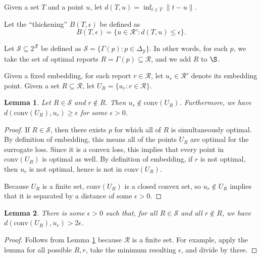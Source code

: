 \documentclass{article}
\newcommand{\Comments}{1}
\newcommand{\mynote}[2]{\ifnum\Comments=1\textcolor{#1}{#2}\fi}
\newcommand{\bo}[1]{\mynote{blue}{[Bo: #1]}}
\newcommand{\R}{\mathcal{R}}
\newcommand{\Y}{\mathcal{Y}}
\newcommand{\conv}{\mathrm{conv}}
\newtheorem{lemma}{Lemma}
\begin{document}
Given a set $T$ and a point $u$, let $d(T,u) = \inf_{t \in T} \|t-u\|$.

Let the ``thickening'' $B(T,\epsilon)$ be defined as
  \[ B(T,\epsilon) = \{u \in \R' : d(T,u) \leq \epsilon \} . \]

Let $\mathcal{S} \subseteq 2^{\R}$ be defined as $\mathcal{S} = \{\Gamma(p) : p \in \Delta_{\Y}\}$.
In other words, for each $p$, we take the set of optimal reports $R = \Gamma(p) \subseteq \R$, and we add $R$ to $\S$.

Given a fixed embedding, for each report $r \in \R$, let $u_r \in \R'$ denote its embedding point.
Given a set $R \subseteq \R$, let $U_R = \{u_r : r \in \R\}$.

\begin{lemma} \label{lemma:conv-R-no-contain}
  Let $R \in \mathcal{S}$ and $r \not\in R$.
  Then $u_r \not\in \conv(U_R)$.
  Furthermore, we have $d(\conv(U_R), u_r) \geq \epsilon$ for some $\epsilon > 0$.
\end{lemma}
\begin{proof}
  If $R \in \mathcal{S}$, then there exists $p$ for which all of $R$ is simultaneously optimal.
  By definition of embedding, this means all of the points $U_R$ are optimal for the surrogate loss.
  Since it is a convex loss, this implies that every point in $\conv(U_R)$ is optimal as well.
  By definition of embedding, if $r$ is not optimal, then $u_r$ is not optimal, hence is not in $\conv(U_R)$.

  Because $U_R$ is a finite set, $\conv(U_R)$ is a closed convex set, so $u_r \not\in U_R$ implies that it is separated by a distance of some $\epsilon > 0$.
\end{proof}

\begin{lemma} \label{lemma:conv-R-min-eps}
  There is some $\epsilon > 0$ such that, for all $R \in \mathcal{S}$ and all $r \not\in R$, we have $d(\conv(U_R), u_r) > 2\epsilon$.
\end{lemma}
\begin{proof}
  Follows from Lemma \ref{lemma:conv-R-no-contain} because $\R$ is a finite set. For example, apply the lemma for all possible $R,r$, take the minimum resulting $\epsilon$, and divide by three.
\end{proof}

%
\end{document}
